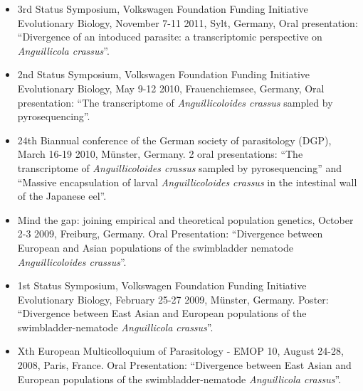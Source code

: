 \begin{itemize}

\item 3rd Status Symposium, Volkswagen Foundation Funding Initiative
  Evolutionary Biology, November 7-11 2011, Sylt, Germany, Oral
  presentation: ``Divergence of an intoduced parasite: a
  transcriptomic perspective on \textit{Anguillicola crassus}''.

\item 2nd Status Symposium, Volkswagen Foundation Funding Initiative
  Evolutionary Biology, May 9-12 2010, Frauenchiemsee, Germany, Oral
  presentation: ``The transcriptome of \textit{Anguillicoloides
    crassus} sampled by pyrosequencing''.

\item 24th Biannual conference of the German society of parasitology
  (DGP), March 16-19 2010, M\"unster, Germany. 2 oral presentations:
  ``The transcriptome of \textit{Anguillicoloides crassus} sampled by
  pyrosequencing'' and ``Massive encapsulation of larval
  \textit{Anguillicoloides crassus} in the intestinal wall of the
  Japanese eel''.

\item Mind the gap: joining empirical and theoretical population
  genetics, October 2-3 2009, Freiburg, Germany. Oral Presentation:
  ``Divergence between European and Asian populations of the
  swimbladder nematode \textit{Anguillicoloides crassus}''.

\item 1st Status Symposium, Volkswagen Foundation Funding Initiative
  Evolutionary Biology, February 25-27 2009, M\"unster,
  Germany. Poster: ``Divergence between East Asian and European
  populations of the swimbladder-nematode \textit{Anguillicola
    crassus}''.

\item Xth European Multicolloquium of Parasitology - EMOP 10, August
  24-28, 2008, Paris, France. Oral Presentation: ``Divergence between
  East Asian and European populations of the swimbladder-nematode
  \textit{Anguillicola crassus}''.

\end{itemize}



